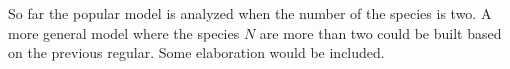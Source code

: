 So far the popular model is analyzed when the number of the species is two. A more general model where the species $N$ are more than two could be built based on the previous regular. Some elaboration would be included.